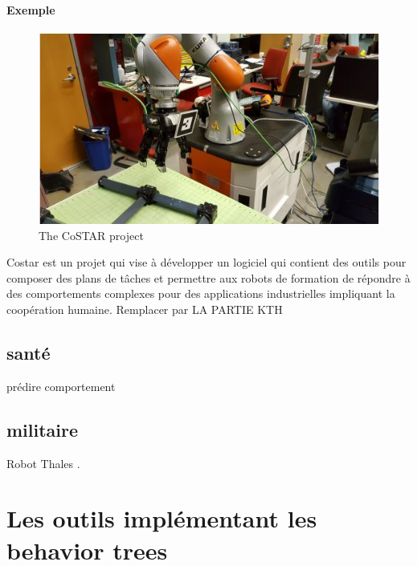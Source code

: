 \documentclass[titlepage]{article}
\begin{document}
		\paragraph{Exemple}
		\begin{figure}[h!]
			\includegraphics[width=\linewidth]{img/robotind.JPG}
			\caption{The CoSTAR project}
			\label{fig:civil}
		\end{figure}
		Costar est un projet qui vise à développer un logiciel qui contient des outils pour composer des plans de tâches et permettre aux robots de formation de répondre à des comportements complexes pour des applications industrielles impliquant la coopération humaine.
		Remplacer par LA PARTIE KTH
		
		\subsection{santé}
	prédire comportement
	
		\subsection{militaire}
	Robot Thales \cite{mer_et_marine_2018}.

	\section{Les outils implémentant les behavior trees}
\end{document}
